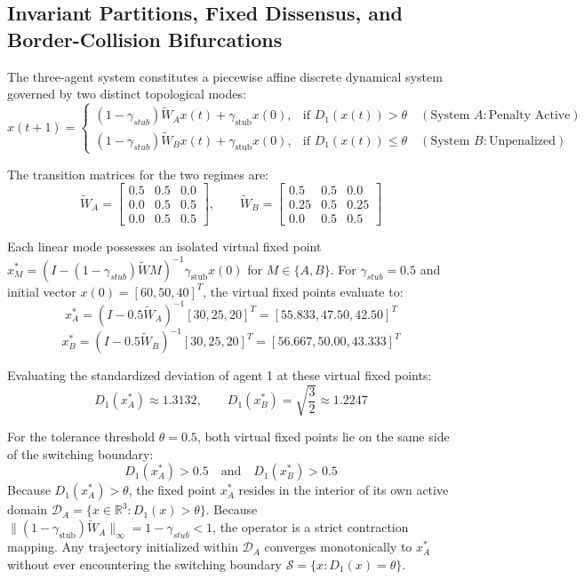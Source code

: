 \subsection{Invariant Partitions, Fixed Dissensus, and Border-Collision Bifurcations}
The three-agent system constitutes a piecewise affine discrete dynamical system governed by two distinct topological modes\cite{acemoglu2013opinion,hajnal1958weak}: $$x(t+1) = \begin{cases} (1 - \gamma_{stub}) \tilde{W}_A x(t) + \gamma_{\text{stub}} x(0), & \text{if } D_1(x(t)) > \theta \quad (\text{System } A: \text{Penalty Active}) \\ (1 - \gamma_{stub}) \tilde{W}_B x(t) + \gamma_{\text{stub}} x(0), & \text{if } D_1(x(t)) \le \theta \quad (\text{System } B: \text{Unpenalized}) \end{cases}$$

The transition matrices for the two regimes are\cite{acemoglu2013opinion}: $$\tilde{W}_A = \begin{bmatrix} 0.5 & 0.5 & 0.0 \\ 0.0 & 0.5 & 0.5 \\ 0.0 & 0.5 & 0.5 \end{bmatrix}, \qquad \tilde{W}_B = \begin{bmatrix} 0.5 & 0.5 & 0.0 \\ 0.25 & 0.5 & 0.25 \\ 0.0 & 0.5 & 0.5 \end{bmatrix}$$

Each linear mode possesses an isolated virtual fixed point $x_M^* = (I - (1 - \gamma_{stub}) \tilde{W}M)^{-1} \gamma_{\text{stub}} x(0)$ for $M \in \{A, B\}$\cite{acemoglu2013opinion,hajnal1958weak}. For $\gamma_{stub} = 0.5$ and initial vector $x(0) = [60, 50, 40]^T$, the virtual fixed points evaluate to\cite{acemoglu2013opinion}: $$x_A^* = \left( I - 0.5 \tilde{W}_A \right)^{-1} [30, 25, 20]^T = [55.833, 47.50, 42.50]^T$$ $$x_B^* = \left( I - 0.5 \tilde{W}_B \right)^{-1} [30, 25, 20]^T = [56.667, 50.00, 43.333]^T$$

Evaluating the standardized deviation of agent 1 at these virtual fixed points\cite{acemoglu2013opinion}: $$D_1(x_A^*) \approx 1.3132, \qquad D_1(x_B^*) = \sqrt{\frac{3}{2}} \approx 1.2247$$

For the tolerance threshold $\theta = 0.5$, both virtual fixed points lie on the same side of the switching boundary\cite{acemoglu2013opinion}: $$D_1(x_A^*) > 0.5 \quad \text{and} \quad D_1(x_B^*) > 0.5$$ Because $D_1(x_A^*) > \theta$, the fixed point $x_A^*$ resides in the interior of its own active domain $\mathcal{D}_A = \{x \in \mathbb{R}^3 : D_1(x) > \theta\}$\cite{acemoglu2013opinion}. Because $\|(1 - \gamma_{\text{stub}}) \tilde{W}_A\|_\infty = 1 - \gamma_{stub} < 1$, the operator is a strict contraction mapping\cite{acemoglu2013opinion,hajnal1958weak}. Any trajectory initialized within $\mathcal{D}_A$ converges monotonically to $x_A^*$ without ever encountering the switching boundary $\mathcal{S} = \{x : D_1(x) = \theta\}$\cite{acemoglu2013opinion}.

